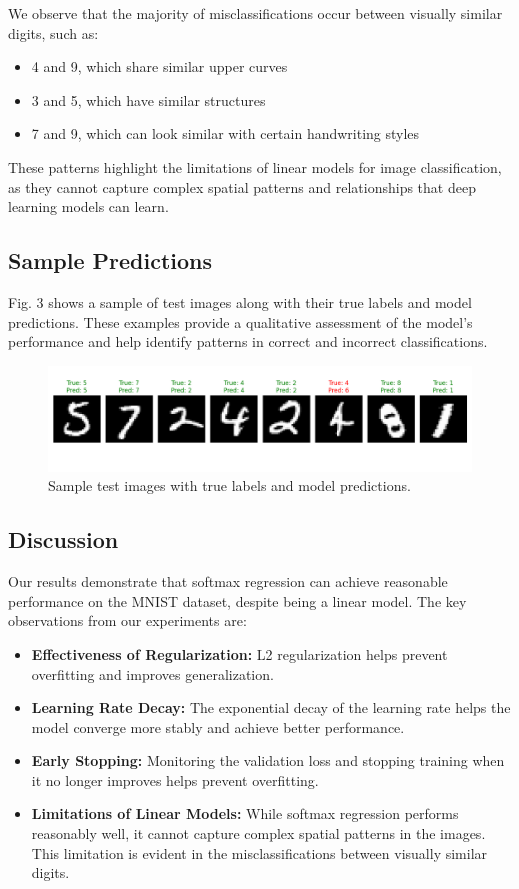 \documentclass[10pt,journal,compsoc]{IEEEtran}
\begin{document}
We observe that the majority of misclassifications occur between visually similar digits, such as:
\begin{itemize}
    \item 4 and 9, which share similar upper curves
    \item 3 and 5, which have similar structures
    \item 7 and 9, which can look similar with certain handwriting styles
\end{itemize}

These patterns highlight the limitations of linear models for image classification, as they cannot capture complex spatial patterns and relationships that deep learning models can learn.

\subsection{Sample Predictions}
Fig. 3 shows a sample of test images along with their true labels and model predictions. These examples provide a qualitative assessment of the model's performance and help identify patterns in correct and incorrect classifications.

\begin{figure}[htbp]
\centering
\includegraphics[width=0.8\linewidth]{img/output.png}
\caption{Sample test images with true labels and model predictions.}
\label{fig:sample_predictions}
\end{figure}

\subsection{Discussion}
Our results demonstrate that softmax regression can achieve reasonable performance on the MNIST dataset, despite being a linear model. The key observations from our experiments are:

\begin{itemize}
    \item \textbf{Effectiveness of Regularization:} L2 regularization helps prevent overfitting and improves generalization.
    
    \item \textbf{Learning Rate Decay:} The exponential decay of the learning rate helps the model converge more stably and achieve better performance.
    
    \item \textbf{Early Stopping:} Monitoring the validation loss and stopping training when it no longer improves helps prevent overfitting.
    
    \item \textbf{Limitations of Linear Models:} While softmax regression performs reasonably well, it cannot capture complex spatial patterns in the images. This limitation is evident in the misclassifications between visually similar digits.
\end{itemize}
\end{document}
